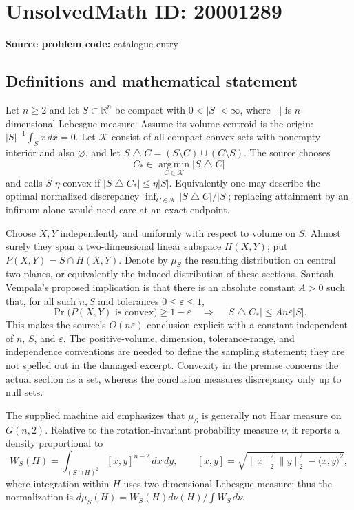 \documentclass[11pt]{article}
\newcommand{\R}{\mathbb{R}}
\begin{document}
\section*{UnsolvedMath ID: 20001289}
\textbf{Source problem code:} catalogue entry
\subsection{Definitions and mathematical statement}
Let $n\geq2$ and let $S\subset\R^n$ be compact with $0<|S|<\infty$, where $|\cdot|$ is $n$-dimensional Lebesgue measure. Assume its volume centroid is the origin: $|S|^{-1}\int_S x\,dx=0$. Let $\mathcal K$ consist of all compact convex sets with nonempty interior and also $\varnothing$, and let $S\mathbin{\triangle}C=(S\setminus C)\cup(C\setminus S)$. The source chooses
\[
 C_*\in\operatorname*{arg\,min}_{C\in\mathcal K}|S\mathbin{\triangle}C|
\]
and calls $S$ $\eta$-convex if $|S\mathbin{\triangle}C_*|\leq\eta|S|$. Equivalently one may describe the optimal normalized discrepancy $\inf_{C\in\mathcal K}|S\mathbin{\triangle}C|/|S|$; replacing attainment by an infimum alone would need care at an exact endpoint.

Choose $X,Y$ independently and uniformly with respect to volume on $S$. Almost surely they span a two-dimensional linear subspace $H(X,Y)$; put $P(X,Y)=S\cap H(X,Y)$. Denote by $\mu_S$ the resulting distribution on central two-planes, or equivalently the induced distribution of these sections. Santosh Vempala's proposed implication is that there is an absolute constant $A>0$ such that, for all such $n,S$ and tolerances $0\leq\varepsilon\leq1$,
\[
 \Pr\bigl(P(X,Y)\text{ is convex}\bigr)\geq1-\varepsilon
 \quad\Longrightarrow\quad
 |S\mathbin{\triangle}C_*|\leq A n\varepsilon |S|.
\]
This makes the source's $O(n\varepsilon)$ conclusion explicit with a constant independent of $n$, $S$, and $\varepsilon$. The positive-volume, dimension, tolerance-range, and independence conventions are needed to define the sampling statement; they are not spelled out in the damaged excerpt. Convexity in the premise concerns the actual section as a set, whereas the conclusion measures discrepancy only up to null sets.

The supplied machine aid emphasizes that $\mu_S$ is generally not Haar measure on $G(n,2)$. Relative to the rotation-invariant probability measure $\nu$, it reports a density proportional to
\[
 W_S(H)=\int_{(S\cap H)^2}[x,y]^{n-2}\,dx\,dy,
 \qquad [x,y]=\sqrt{\|x\|_2^2\|y\|_2^2-\langle x,y\rangle^2},
\]
where integration within $H$ uses two-dimensional Lebesgue measure; thus the normalization is $d\mu_S(H)=W_S(H)d\nu(H)/\int W_S\,d\nu$.
\end{document}
